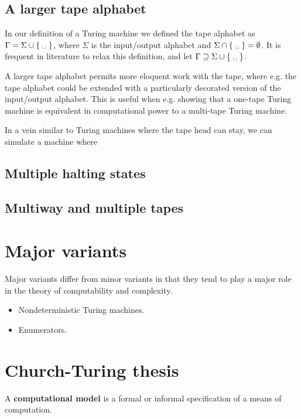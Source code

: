 \subsection{A larger tape alphabet}

In our definition of a Turing machine we defined the tape alphabet as $\Gamma =
\Sigma \cup \set{\blank}$, where $\Sigma$ is the input/output alphabet and
$\Sigma \cap \set{\blank} = \emptyset$. It is frequent in literature to relax
this definition, and let $\Gamma \supseteq \Sigma \cup \set{\blank}$.

A larger tape alphabet permits more eloquent work with the tape, where e.g. the
tape alphabet could be extended with a particularly decorated version of the
input/output alphabet. This is useful when e.g. showing that a one-tape Turing
machine is equivalent in computational power to a multi-tape Turing machine.

In a vein similar to Turing machines where the tape head can stay, we can
simulate a machine where

\subsection{Multiple halting states}

\subsection{Multiway and multiple tapes}

\section{Major variants}

Major variants differ from minor variants in that they tend to play a major
role in the theory of computability and complexity.

\begin{itemize}

\item Nondeterministic Turing machines.

\item Enumerators.

\end{itemize}

\section{Church-Turing thesis}

\begin{notion} A \textbf{computational model} is a formal or informal
specification of a means of computation.\end{notion}

